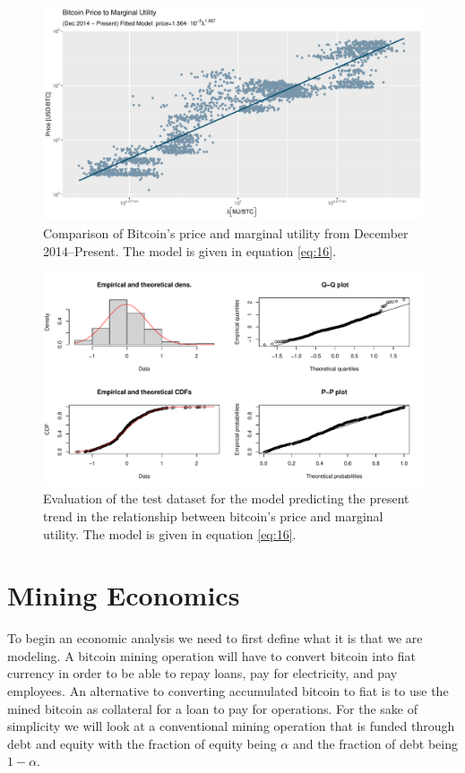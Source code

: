 \documentclass[runningheads]{llncs}
\begin{document}
\begin{figure}
    \includegraphics[width=\textwidth]{BTC Price and Marginal Utility.pdf}
    \caption{Comparison of Bitcoin's price and marginal utility from December 2014--Present.
        The model is given in equation \ref{eq:16}.} \label{fig:7}
\end{figure}
\begin{figure}
    \includegraphics[width=\textwidth]{BTC Price and Marginal Utility Fit Test.pdf}
    \caption{Evaluation of the test dataset for the model predicting the present trend in the relationship between bitcoin's price and marginal utility.
        The model is given in equation \ref{eq:16}.} \label{fig:8}
\end{figure}
\section{Mining Economics}
To begin an economic analysis we need to first define what it is that we are modeling.
A bitcoin mining operation will have to convert bitcoin into fiat currency in order to be able to repay loans, pay for electricity, and pay employees.
An alternative to converting accumulated bitcoin to fiat is to use the mined bitcoin as collateral for a loan to pay for operations.
For the sake of simplicity we will look at a conventional mining operation that is funded through debt and equity with the fraction of equity being $\alpha$ and the fraction of debt being $1 - \alpha$.
\end{document}
